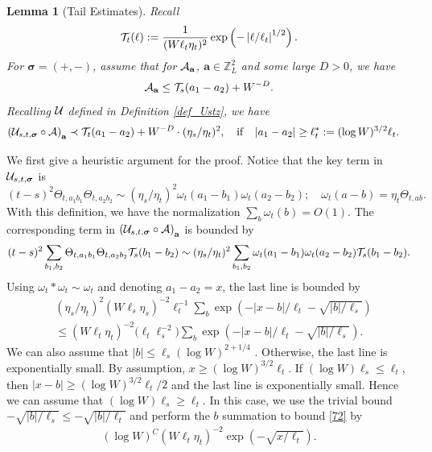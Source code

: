 \documentclass[10pt,reqno]{article}
\theoremstyle{plain} %
\newtheorem{lemma}[theorem]{Lemma}
\theoremstyle{remark}
\numberwithin{equation}{section}
\begin{document}
\begin{lemma}[Tail Estimates]\label{TailtoTail}
Recall  
 $${\cal T}_{t}(\ell) := \frac{1}{(W\ell_t\eta_t)^2} \exp \left(- \left| \ell /\ell_t\right|^{1/2} \right).
$$
For $\boldsymbol{\sigma}=(+,-)$, assume that for ${\cal A}_{\textbf{a}}$, $\textbf{a}\in \mathbb Z^2_L$ and some large $D>0$, we have 
$$
{\cal A}_{\textbf{a}}\le {\cal T}_{s }(a_1-a_2)+W^{-D}. 
$$
Recalling  $\cal U$ defined in Definition  \ref{def_Ustz}, we have 
\begin{align}
\label{neiwuj} 
\left({\cal U}_{s,t,\boldsymbol{\sigma}} \circ 
{\cal A}\right)_{\textbf{a}} & \prec
 {\cal T}_{t}( a_1-a_2)+W^{-D} \cdot(\eta_s/\eta_t)^2, \quad {\rm if}\quad  |a_1-a_2|\ge \ell_t^* :=(\log W)^{3/2}\ell_t . 
\end{align}
 \end{lemma}
We first give a heuristic argument for the proof. Notice that the key term in ${\cal U}_{s,t,\boldsymbol{\sigma}}$ is 
\[
(t-s)^2    \Theta_{t, a_1b_1} \Theta_{t, a_2b_2}
\sim  (\eta_s/\eta_t)^2 \omega_{t}( a_1-b_1)\omega_{t}( a_2-b_2);  \quad 
\omega_{t}(a-b) =  \eta_t  \Theta_{t, ab}.
\]
With this definition, we have the normalization $ \sum_b \omega_{t} (b) = O(1)$.
The corresponding term in $\left({\cal U}_{s,t,\boldsymbol{\sigma}} \circ 
{\cal A}\right)_{\textbf{a}} $ is bounded by 
\begin{align}
(t-s)^2   \sum_{b_1, b_2}  \Theta_{t, a_1b_1} \Theta_{t, a_2b_2} {\cal T}_{s }(b_1-b_2)
\sim (\eta_s/\eta_t)^2  \sum_{b_1, b_2} \omega_{t}( a_1-b_1) \omega_{t}( a_2-b_2) {\cal T}_{s }(b_1-b_2).
\end{align}
Using $\omega_{t} \ast  \omega_{t} \sim  \omega_{t}$ and denoting $a_1-a_2 = x$, the last line is bounded by 
\begin{align}\label{72} 
& (\eta_s/\eta_t)^2  (W\ell_s\eta_s)^{-2}  \ell_t^{-1} \sum_{b}  \exp \left(- | x-b |/\ell_t - \sqrt { | b |/\ell_s  } \right) \nonumber \\
& \le   (W\ell_t\eta_t)^{-2}  \big ( \ell_t \ell_s^{-2} ) \sum_{b}  \exp \left(- | x-b |/\ell_t - \sqrt { | b |/\ell_s  } \right) .
\end{align}
We can also assume that $|b| \le \ell_s (\log W)^{2+1/4}$ . Otherwise, the last line  is exponentially  small.   By assumption,  $x \ge (\log W)^{3/2}\ell_t$.  If  $(\log W) \ell_s \le \ell_t$,   then  $ |x-b| \ge (\log W)^{3/2}\ell_t/2$  and the last line is exponentially small.  Hence we can assume that  $(\log W) \ell_s \ge \ell_t$. In this case,  we use the trivial bound  $-\sqrt { | b |/\ell_s  } \le -\sqrt { | b |/\ell_t  }$   and perform the $b$ summation to bound   \eqref{72}  by 
\begin{align}
(\log W)^C  (W\ell_t\eta_t)^{-2}    \exp \left( - \sqrt {  x/\ell_t } \right). 
\end{align}
\end{document}
